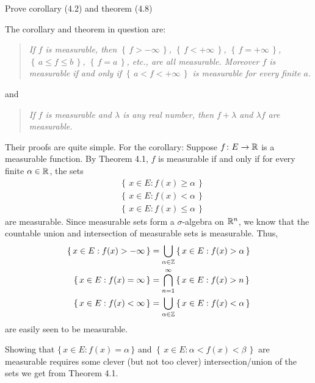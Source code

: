 \begin{problem}
  Prove corollary (4.2) and theorem (4.8)
\end{problem}
\begin{solution}
  The corollary and theorem in question are:
  \begin{quote}
    \emph{If $f$ is measurable, then $\left\{\,f>-\infty\,\right\}$,
      $\left\{\,f<+\infty\,\right\}$, $\left\{\,f=+\infty\,\right\}$,
      $\left\{\,a\leq f\leq b\,\right\}$, $\left\{\,f=a\,\right\}$, etc.,
      are all measurable. Moreover $f$ is measurable if and only if
      $\left\{\,a<f<+\infty\,\right\}$ is measurable for every finite $a$.}
  \end{quote}
  and
  \begin{quote}
    \emph{If $f$ is measurable and $\lambda$ is any real number, then
      $f+\lambda$ and $\lambda f$ are measurable.}
  \end{quote}

  Their proofs are quite simple. For the corollary: Suppose
  $f\colon E\to\mathbb{R}$ is a measurable function. By Theorem 4.1, $f$ is
  measurable if and only if for every finite $\alpha\in\mathbb{R}$, the sets
  \begin{align*}
    &\left\{\,x\in E: f(x)\geq\alpha\,\right\}\\
    &\left\{\,x\in E:f(x)<\alpha\,\right\}\\
    &\left\{\,x\in E:f(x)\leq\alpha\,\right\}
  \end{align*}
  are measurable. Since measurable sets form a $\sigma$-algebra on
  $\mathbb{R}^n$, we know that the countable union and intersection of measurable
  sets is measurable. Thus,
  \begin{align*}
    \left\{\,x\in E:f(x)>-\infty\,\right\}
    &=\bigcup_{\alpha\in\mathbb{Z}}\left\{\,x\in E:f(x)>\alpha\,\right\}\\
    \left\{\,x\in E:f(x)=\infty\,\right\}
    &=\bigcap_{n=1}^\infty\left\{\,x\in E:f(x)>n\,\right\}\\
    \left\{\,x\in E:f(x)<\infty\,\right\}
    &=\bigcup_{\alpha\in\mathbb{Z}}\left\{\,x\in E:f(x)<\alpha\,\right\}
  \end{align*}
  are easily seen to be measurable.

  Showing that $\{\,x\in E:f(x)=\alpha\,\}$ and
  $\left\{\,x\in E:\alpha<f(x)<\beta\,\right\}$ are measurable requires
  some clever (but not too clever) intersection/union of the sets we get
  from Theorem 4.1.



\end{solution}
